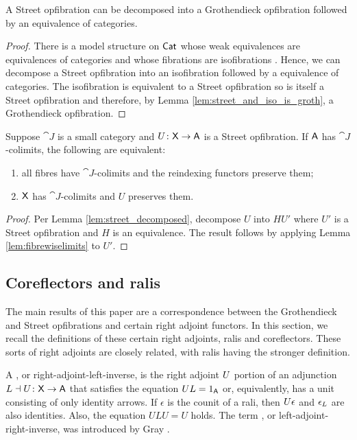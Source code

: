 \documentclass{amsart}
\begin{document}
\begin{lem} \label{lem:street_decomposed} A Street opfibration can be
  decomposed into a Grothendieck opfibration followed by an
  equivalence of categories.
\end{lem}

\begin{proof}
  There is a model structure on $\mathsf{Cat}$ whose weak equivalences are
  equivalences of categories and whose fibrations are isofibrations
  \cite{rezk}. Hence, we can decompose a Street opfibration into an
  isofibration followed by a equivalence of categories. The
  isofibration is equivalent to a Street opfibration so is itself a
  Street opfibration and therefore, by Lemma
  \ref{lem:street_and_iso_is_groth}, a Grothendieck opfibration.
\end{proof}

\begin{lem} \label{lem:street-fibrewise-limits}
  Suppose $ \cat{J} $ is a small category and $ U \colon \mathsf{X}
  \to \mathsf{A} $ is a Street opfibration. If $ \mathsf{A} $ has $ \cat{J}
  $-colimits, the following are equivalent:
  \begin{enumerate}
  \item
    all fibres have $ \cat{J} $-colimits and the
    reindexing functors preserve them;
  \item
    $ \mathsf{X} $ has $ \cat{J} $-colimits and $ U $ preserves
    them.
  \end{enumerate}
\end{lem}

\begin{proof}
  Per Lemma \ref{lem:street_decomposed}, decompose $U$ into $H U'$
  where $U'$ is a Street opfibration and $H$ is an equivalence. The
  result follows by applying Lemma \ref{lem:fibrewiselimits} to $U'$.
\end{proof}

\subsection{Coreflectors and ralis} %

The main results of this paper are a correspondence between the
Grothendieck and Street opfibrations and certain right adjoint
functors. In this section, we recall the definitions of these certain
right adjoints, ralis and coreflectors. These sorts of right adjoints
are closely related, with ralis having the stronger definition.

A , or right-adjoint-left-inverse, is the right adjoint
$U$ portion of an adjunction $L\dashv U\colon\mathsf{X}\to\mathsf{A}$ that satisfies
the equation $UL=1_{\mathsf{A}}$ or, equivalently, has a unit consisting of
only identity arrows. If $\epsilon$ is the counit of a rali, then
$U\epsilon$ and $\epsilon_L$ are also identities. Also, the equation
$ULU=U$ holds. The term , or left-adjoint-right-inverse,
was introduced by Gray \cite{Grayfibredandcofibred}.
\end{document}
